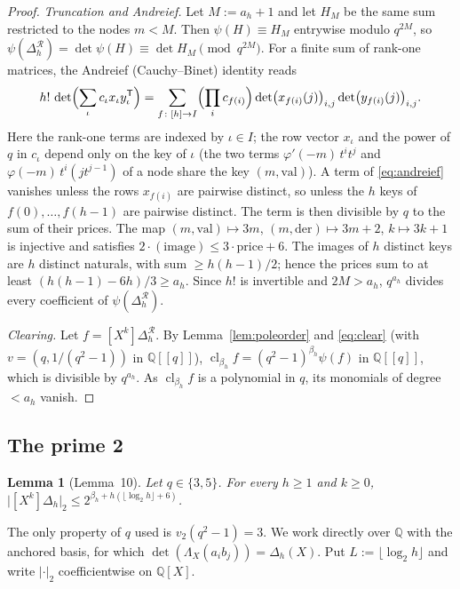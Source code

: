 \documentclass[11pt]{amsart}
\newtheorem{lemma}[theorem]{Lemma}
\theoremstyle{definition}
\theoremstyle{remark}
\numberwithin{equation}{section}
\newcommand{\QQ}{\mathbb{Q}}
\newcommand{\cR}{\mathcal{R}}
\begin{document}
\begin{proof}
\emph{Truncation and Andreief.} Let $M:=a_h+1$ and let $H_M$ be the same sum restricted to the nodes $m<M$. Then
$\psi(H)\equiv H_M$ entrywise modulo $q^{2M}$, so $\psi(\Delta^{\cR}_h)=\det\psi(H)\equiv\det H_M\pmod{q^{2M}}$. For a finite
sum of rank-one matrices, the Andreief (Cauchy--Binet) identity \cite{Andreief,Forrester2019} reads
\begin{equation}\label{eq:andreief}
  h!\,\det\Bigl(\sum_\iota c_\iota x_\iota y_\iota^{\mathsf T}\Bigr)
  =\sum_{f\colon[h]\to I}\Bigl(\prod_ic_{f(i)}\Bigr)\det\bigl(x_{f(i)}(j)\bigr)_{i,j}\det\bigl(y_{f(i)}(j)\bigr)_{i,j}.
\end{equation}
Here the rank-one terms are indexed by $\iota\in I$; the row vector $x_\iota$ and the power of $q$ in $c_\iota$ depend only
on the key of $\iota$ (the two terms $\varphi'(-m)\,t^it^j$ and $\varphi(-m)\,t^i(jt^{j-1})$ of a node share the key
$(m,\mathrm{val})$). A term of \eqref{eq:andreief} vanishes unless the rows $x_{f(i)}$ are pairwise distinct, so unless
the $h$ keys of $f(0),\dots,f(h-1)$ are pairwise distinct. The term is then divisible by $q$ to the sum of their prices. The map $(m,\mathrm{val})\mapsto3m$, $(m,\mathrm{der})\mapsto3m+2$,
$k\mapsto3k+1$ is injective and satisfies $2\cdot(\text{image})\le3\cdot\text{price}+6$. The images of $h$ distinct keys
are $h$ distinct naturals, with sum $\ge h(h-1)/2$; hence the prices sum to at least $(h(h-1)-6h)/3\ge a_h$. Since $h!$
is invertible and $2M>a_h$, $q^{a_h}$ divides every coefficient of $\psi(\Delta^{\cR}_h)$.

\emph{Clearing.} Let $f=[X^k]\Delta^{\cR}_h$. By Lemma~\ref{lem:poleorder} and \eqref{eq:clear} (with $v=(q,1/(q^2-1))$ in
$\QQ[[q]]$), $\operatorname{cl}_{\beta_h}f=(q^2-1)^{\beta_h}\psi(f)$ in $\QQ[[q]]$, which is divisible by $q^{a_h}$. As
$\operatorname{cl}_{\beta_h}f$ is a polynomial in $q$, its monomials of degree $<a_h$ vanish.
\end{proof}

\subsection{The prime 2}

\begin{lemma}[Lemma~10]\label{lem:two}
Let $q\in\{3,5\}$. For every $h\ge1$ and $k\ge0$, $\bigl|[X^k]\Delta_h\bigr|_2\le2^{\beta_h+h(\lfloor\log_2h\rfloor+6)}$.
\end{lemma}

The only property of $q$ used is $v_2(q^2-1)=3$. We work directly over $\QQ$ with the anchored basis, for which
$\det(\Lambda_X(a_ib_j))=\Delta_h(X)$. Put $L:=\lfloor\log_2h\rfloor$ and write $|\cdot|_2$ coefficientwise on $\QQ[X]$.
\end{document}

